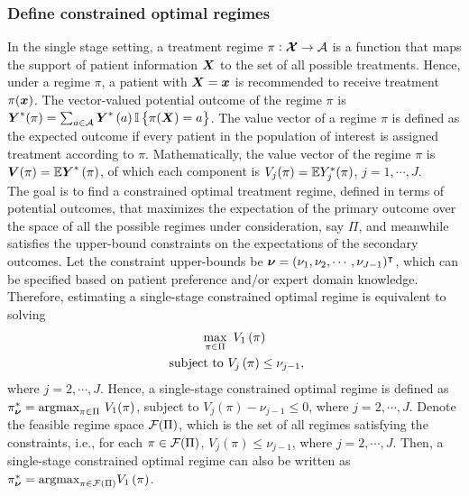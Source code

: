 \subsubsection{Define constrained optimal regimes}
In the single stage setting, a treatment regime $\pi : \boldsymbol{\mathcal{X}} \rightarrow \mathcal{A}$ is a function that maps the support of patient information $\boldsymbol{X}$ to the set of all possible treatments. Hence, under a regime $\pi$, a patient with $\boldsymbol{X} = \boldsymbol{x}$ is recommended to receive treatment $\pi(\boldsymbol{x})$. The vector-valued potential outcome of the regime $\pi$ is $\boldsymbol{Y}^{*}(\pi) =  \sum_{a \in \mathcal{A}}\boldsymbol{Y}^{*}\left(a\right)\mathbb{I}\left\{ \pi(\boldsymbol{X}) = a \right\}$. The value vector of a regime $\pi$ is defined as the expected outcome if every patient in the population of interest is assigned treatment according to $\pi$. Mathematically, the value vector of the regime $\pi$ is $\boldsymbol{V}(\pi) = \mathbb{E} {\boldsymbol{Y}^{*}\left(\pi\right)}$, of which each component is $V_j(\pi) = \mathbb{E}Y_j^{*}(\pi)$, $j = 1, \cdots, J$. \\
 
The goal is to find a constrained optimal treatment regime, defined in terms of potential outcomes, that maximizes the expectation of the primary outcome over the space of all the possible regimes under consideration, say $\Pi$, and meanwhile satisfies the upper-bound constraints on the expectations of the secondary outcomes. Let the constraint upper-bounds be $\boldsymbol{\nu} = (\nu_1, \nu_2, \cdots, \nu_{J-1})^\intercal$, which can be specified based on patient preference and/or expert domain knowledge. Therefore, estimating a single-stage  constrained optimal regime is equivalent to solving
\begin{equation}
\begin{gathered}
\max_{\pi \in \Pi} \,\, V_1\left(\pi\right) \\
\text{ subject to } V_j\left(\pi\right) \le \nu_{j-1},
\end{gathered}
\end{equation}  where $j = 2, \cdots, J$.  Hence, a single-stage constrained optimal regime is defined as $\pi^*_{\boldsymbol{\nu}} = \text{argmax}_{\pi \in \Pi} \,\, V_1(\pi)$, subject to $V_j(\pi) - \nu_{j-1} \le 0$, where $j = 2, \cdots, J$. Denote the feasible regime space $\mathcal{F}(\Pi)$, which is the set of all regimes satisfying the constraints, i.e., for each $\pi \in \mathcal{F}(\Pi)$, $V_j(\pi) \le \nu_{j-1}$, where $j = 2, \cdots, J$. Then, a single-stage constrained optimal regime can also be written as $\pi^*_{\boldsymbol{\nu}} = \text{argmax}_{\pi \in \mathcal{F}(\Pi)}V_1\left(\pi\right)$.\\
 
